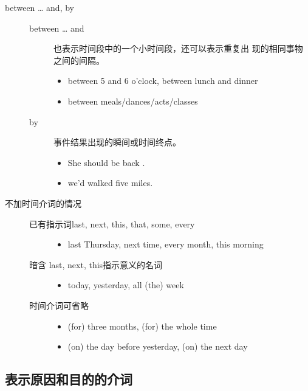 \begin{description}
\item[between \ldots{} and, by]
  \begin{description}
  \item[between \ldots{} and] 也表示时间段中的一个小时间段，还可以表示重复出
    现的相同事物之间的间隔。
    \begin{itemize}
    \item between 5 and 6 o'clock, between lunch and dinner

    \item  between meals/dances/acts/classes
    \end{itemize}

  \item[by] 事件结果出现的瞬间或时间终点。
    \begin{itemize}
    \item She should be back .

    \item {} we'd walked five miles.
    \end{itemize}

  \end{description}
\item[不加时间介词的情况]
  \begin{description}
  \item[已有指示词last, next, this, that, some, every]
    \begin{itemize}
    \item last Thursday, next time, every month, this morning
    \end{itemize}

  \item[暗含 last, next, this指示意义的名词]
    \begin{itemize}
    \item today, yesterday, all (the) week
    \end{itemize}


  \item[时间介词可省略]
    \begin{itemize}
    \item (for) three months, (for) the whole time

    \item (on) the day before yesterday, (on) the next day
    \end{itemize}
  \end{description}
\end{description}


\subsection{表示原因和目的的介词}

